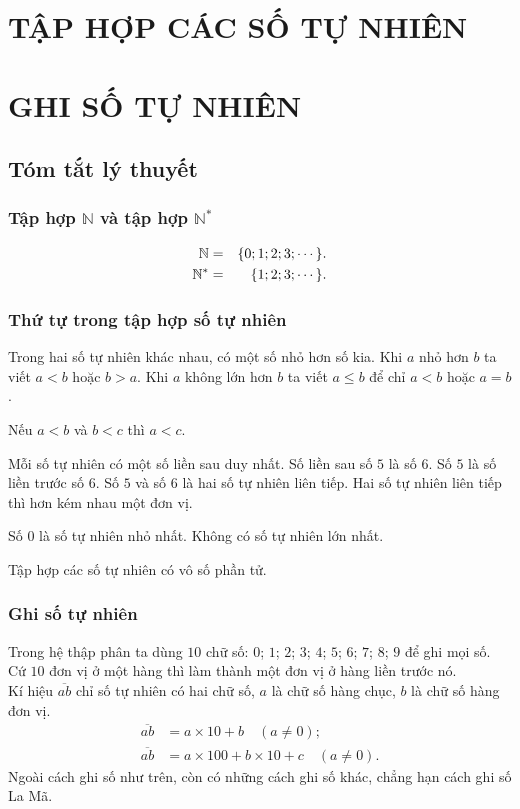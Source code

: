 \section{TẬP HỢP CÁC SỐ TỰ NHIÊN}
\section{GHI SỐ TỰ NHIÊN}
\subsection{Tóm tắt lý thuyết}
\subsubsection{Tập hợp $\mathbb{N}$ và tập hợp $\mathbb{N}^*$}
\begin{eqnarray}
\mathbb{N}&=&\{0; 1; 2; 3; \cdots\}.\notag\\
\mathbb{N}^*&=&\{1; 2; 3; \cdots\}.\notag
\end{eqnarray}
\subsubsection{Thứ tự trong tập hợp số tự nhiên}
\begin{enumEX}{1}
\item Trong hai số tự nhiên khác nhau, có một số nhỏ hơn số kia. Khi $a$ nhỏ hơn $b$ ta viết $a < b$ hoặc $b > a$. Khi $a$ không lớn hơn $b$ ta viết $a \leq b$ để chỉ $a < b$ hoặc $a = b$.
\item Nếu $a < b$ và $b < c$ thì $a < c$.
\item Mỗi số tự nhiên có một số liền sau duy nhất. Số liền sau số $5$ là số $6$. Số $5$ là số liền trước số $6$. Số $5$ và số $6$ là hai số tự nhiên liên tiếp. Hai số tự nhiên liên tiếp thì hơn kém nhau một đơn vị.
\item Số $0$ là số tự nhiên nhỏ nhất. Không có số tự nhiên lớn nhất.
\item Tập hợp các số tự nhiên có vô số phần tử. 	
\end{enumEX}
\subsubsection{Ghi số tự nhiên}

Trong hệ thập phân ta dùng $10$ chữ số: $0$; $1$; $2$; $3$; $4$; $5$; $6$; $7$; $8$; $9$ để ghi mọi số. Cứ $10$ đơn vị ở một hàng thì làm thành một đơn vị ở hàng liền trước nó.\\
Kí hiệu $\overline{ab}$ chỉ số tự nhiên có hai chữ số, $a$ là chữ số hàng chục, $b$ là chữ số hàng đơn vị.
\begin{align*}
\overline{ab} &= a \times 10 + b \quad (a \neq 0);\\
\overline{ab} &= a \times 100 + b \times 10 + c \quad (a \neq 0).
\end{align*}
Ngoài cách ghi số như trên, còn có những cách ghi số khác, chẳng hạn cách ghi số La Mã.
